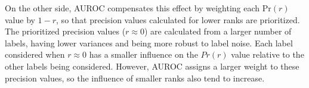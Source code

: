 %
%
%
%
%
%
%
On the other side, AUROC compensates this effect by weighting each $\text{Pr}(r)$ value by $1 - r$, so that precision values calculated for lower ranks are prioritized. The prioritized precision values ($r\approx 0$) are calculated from a larger number of labels, having lower variances and being more robust to label noise. Each label considered when $r \approx 0$ has a smaller influence on the $Pr(r)$ value relative to the other labels being considered. However, AUROC assigns a larger weight to these precision values, so the influence of smaller ranks also tend to increase.

